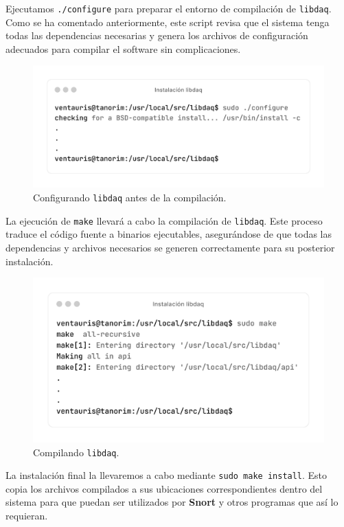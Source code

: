 \documentclass[12pt,a4paper]{report}
\begin{document}
Ejecutamos \texttt{./configure} para preparar el entorno de compilación de \texttt{libdaq}. Como se ha comentado anteriormente, este script revisa que el sistema tenga todas las dependencias necesarias y genera los archivos de configuración adecuados para compilar el software sin complicaciones.

\begin{figure}[H]
	\centering
	\includegraphics[scale=0.12]{instalacion_snort/11-11.png}
	\caption{Configurando \texttt{libdaq} antes de la compilación.}
\end{figure}

La ejecución de \texttt{make} llevará a cabo la compilación de \texttt{libdaq}. Este proceso traduce el código fuente a binarios ejecutables, asegurándose de que todas las dependencias y archivos necesarios se generen correctamente para su posterior instalación.

\begin{figure}[H]
	\centering
	\includegraphics[scale=0.12]{instalacion_snort/12-12.png}
	\caption{Compilando \texttt{libdaq}.}
\end{figure}

\newpage

La instalación final la llevaremos a cabo mediante \texttt{sudo make install}. Esto copia los archivos compilados a sus ubicaciones correspondientes dentro del sistema para que puedan ser utilizados por \textbf{Snort} y otros programas que así lo requieran.
\end{document}

